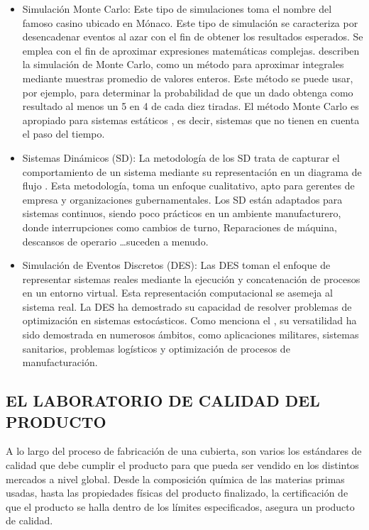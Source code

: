 \begin{itemize}
	\item Simulación Monte Carlo: Este tipo de simulaciones toma el nombre
		del famoso casino ubicado en Mónaco.
		Este tipo de simulación se caracteriza por desencadenar eventos al azar
		con el fin de obtener los resultados esperados.
		Se emplea con el fin de aproximar
		expresiones matemáticas complejas.
		\citet{owen2016monte} describen la simulación de Monte Carlo,
		como un método para aproximar integrales
		mediante muestras promedio de valores enteros.
		Este método se puede usar, por ejemplo,
		para determinar la probabilidad de que
		un dado obtenga como resultado
		al menos un 5 en 4 de cada diez tiradas.
		El método Monte Carlo es apropiado para sistemas estáticos
		\citep{lawson2008monte},
		es decir, sistemas que no tienen en cuenta el paso del tiempo. 
		
	\item Sistemas Dinámicos (SD): La metodología de los SD trata de capturar
		el comportamiento de un sistema mediante
		su representación en un diagrama de flujo
		\citep{sweetser1999comparison}.
		Esta metodología, toma un enfoque cualitativo,
		apto para gerentes de empresa y organizaciones gubernamentales.
		Los SD están adaptados para sistemas continuos,
		siendo poco prácticos en un ambiente manufacturero,
		donde interrupciones como cambios de turno,
		Reparaciones de máquina, descansos de operario \ldots suceden a menudo.

	\item Simulación de Eventos Discretos (DES):
		Las DES toman el enfoque de representar sistemas reales
		mediante la ejecución y concatenación
		de procesos en un entorno virtual.
		Esta representación computacional se asemeja al sistema real.
		La DES ha demostrado su capacidad de resolver
		problemas de optimización en sistemas estocásticos.
		Como menciona el \citet	{allen2011introduction},
		su versatilidad ha sido demostrada en numerosos ámbitos,
		como aplicaciones militares,
		sistemas sanitarios,
		problemas logísticos
		y optimización de procesos de manufacturación.
\end{itemize}

\subsection{EL LABORATORIO DE CALIDAD DEL \newline PRODUCTO}

A lo largo del proceso de fabricación de una cubierta,
son varios los estándares de calidad que debe cumplir el producto
para que pueda ser vendido en los distintos mercados a nivel global.
Desde la composición química de las materias primas usadas,
hasta las propiedades físicas del producto finalizado,
la certificación de que el producto se halla dentro de
los límites especificados, asegura un producto de calidad.

